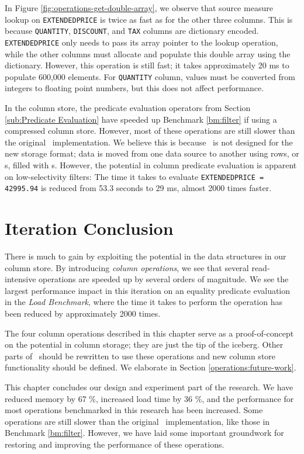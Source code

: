 In Figure \ref{fig:operations-get-double-array}, we observe that source measure lookup on \texttt{EXTENDEDPRICE} is twice as fast as for the other three columns. This is because \texttt{QUANTITY}, \texttt{DISCOUNT}, and \texttt{TAX} columns are dictionary encoded. \texttt{EXTENDEDPRICE} only needs to pass its array pointer to the lookup operation, while the other columns must allocate and populate this double array using the dictionary. However, this operation is still fast; it takes approximately 20 ms to populate 600,000 elements. For \texttt{QUANTITY} column, values must be converted from integers to floating point numbers, but this does not affect performance.

In the column store, the predicate evaluation operators from Section \ref{sub:Predicate Evaluation} have speeded up Benchmark \ref{bm:filter} if using a compressed column store. However, most of these operations are still slower than the original \gap~implementation. We believe this is because \gap~is not designed for the new storage format; data is moved from one data source to another using rows, or s, filled with s. However, the potential in column predicate evaluation is apparent on low-selectivity filters: The time it takes to evaluate \texttt{EXTENDEDPRICE = 42995.94} is reduced from 53.3 seconds to 29 ms, almost 2000 times faster.

\section{Iteration Conclusion}
\label{sec:Chapter Conclusion}
There is much to gain by exploiting the potential in the data structures in our column store. By introducing \textit{column operations}, we see that several read-intensive operations are speeded up by several orders of magnitude. We see the largest performance impact in this iteration on an equality predicate evaluation in the \textit{Load Benchmark}, where the time it takes to perform the operation has been reduced by approximately 2000 times.

The four column operations described in this chapter serve as a proof-of-concept on the potential in column storage; they are just the tip of the iceberg. Other parts of \gap~should be rewritten to use these operations and new column store functionality should be defined. We elaborate in Section \ref{operations:future-work}.

This chapter concludes our design and experiment part of the research. We have reduced memory by 67 \%, increased load time by 36 \%, and the performance for most operations benchmarked in this research has been increased. Some operations are still slower than the original \gap~implementation, like those in Benchmark \ref{bm:filter}. However, we have laid some important groundwork for restoring and improving the performance of these operations.

